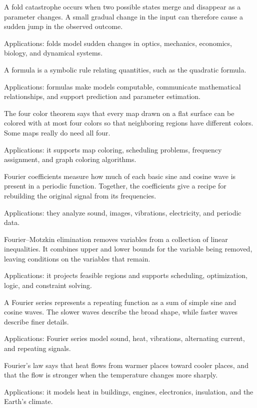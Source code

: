 A fold catastrophe occurs when two possible states merge and disappear as a parameter changes. A small gradual change in the input can therefore cause a sudden jump in the observed outcome. \par\noindent Applications: folds model sudden changes in optics, mechanics, economics, biology, and dynamical systems.

A formula is a symbolic rule relating quantities, such as the quadratic formula. \par\noindent Applications: formulas make models computable, communicate mathematical relationships, and support prediction and parameter estimation.

The four color theorem says that every map drawn on a flat surface can be colored with at most four colors so that neighboring regions have different colors. Some maps really do need all four. \par\noindent Applications: it supports map coloring, scheduling problems, frequency assignment, and graph coloring algorithms.

Fourier coefficients measure how much of each basic sine and cosine wave is present in a periodic function. Together, the coefficients give a recipe for rebuilding the original signal from its frequencies. \par\noindent Applications: they analyze sound, images, vibrations, electricity, and periodic data.

Fourier--Motzkin elimination removes variables from a collection of linear inequalities. It combines upper and lower bounds for the variable being removed, leaving conditions on the variables that remain. \par\noindent Applications: it projects feasible regions and supports scheduling, optimization, logic, and constraint solving.

A Fourier series represents a repeating function as a sum of simple sine and cosine waves. The slower waves describe the broad shape, while faster waves describe finer details. \par\noindent Applications: Fourier series model sound, heat, vibrations, alternating current, and repeating signals.

Fourier's law says that heat flows from warmer places toward cooler places, and that the flow is stronger when the temperature changes more sharply. \par\noindent Applications: it models heat in buildings, engines, electronics, insulation, and the Earth's climate.

